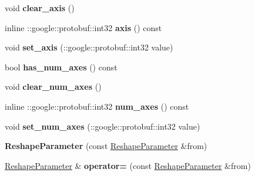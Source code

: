 \begin{DoxyCompactItemize}
void {\bfseries clear\+\_\+axis} ()
\item 
\mbox{\label{classcaffe_1_1_reshape_parameter_ac685e720a4fda58589639c06307e3c70}} 
inline \+::google\+::protobuf\+::int32 {\bfseries axis} () const
\item 
\mbox{\label{classcaffe_1_1_reshape_parameter_a50e0d4404026882e20a92bc20394c668}} 
void {\bfseries set\+\_\+axis} (\+::google\+::protobuf\+::int32 value)
\item 
\mbox{\label{classcaffe_1_1_reshape_parameter_a23b9229e97ea10aa2e24f7fab8ca3352}} 
bool {\bfseries has\+\_\+num\+\_\+axes} () const
\item 
\mbox{\label{classcaffe_1_1_reshape_parameter_ab4104aa12c7128542582cbf0db7cf864}} 
void {\bfseries clear\+\_\+num\+\_\+axes} ()
\item 
\mbox{\label{classcaffe_1_1_reshape_parameter_af2cfce9c71ee635990d237e3efbc8179}} 
inline \+::google\+::protobuf\+::int32 {\bfseries num\+\_\+axes} () const
\item 
\mbox{\label{classcaffe_1_1_reshape_parameter_ae50770983a6c9098668d6aedc2d28b5d}} 
void {\bfseries set\+\_\+num\+\_\+axes} (\+::google\+::protobuf\+::int32 value)
\item 
\mbox{\label{classcaffe_1_1_reshape_parameter_a23753d8a98e1c114a1905aa60218b517}} 
{\bfseries Reshape\+Parameter} (const \mbox{\hyperlink{classcaffe_1_1_reshape_parameter}{Reshape\+Parameter}} \&from)
\item 
\mbox{\label{classcaffe_1_1_reshape_parameter_abb4fa0c7b839c2965c1f69db747d33f2}} 
\mbox{\hyperlink{classcaffe_1_1_reshape_parameter}{Reshape\+Parameter}} \& {\bfseries operator=} (const \mbox{\hyperlink{classcaffe_1_1_reshape_parameter}{Reshape\+Parameter}} \&from)
\item 
\mbox{\label{classcaffe_1_1_reshape_parameter_ad4219f882f07a1e92c05ce1ca8eb06f9}} 

\end{DoxyCompactItemize}
